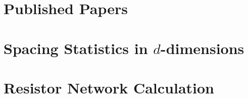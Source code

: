\chapter{Published Papers}

\chapter{Spacing Statistics in $d$-dimensions}



\chapter{Resistor Network Calculation}




